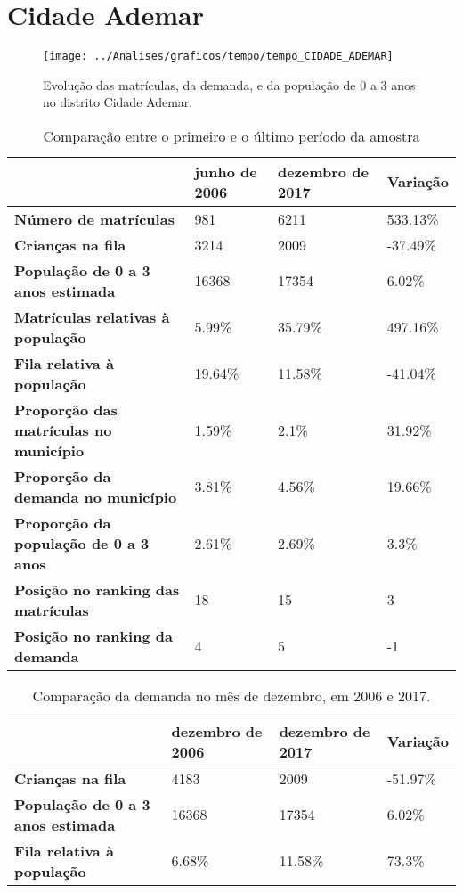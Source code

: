 \section{Cidade Ademar}
\begin{figure}[H]
\centering
\texttt{[image: ../Analises/graficos/tempo/tempo\_CIDADE\_ADEMAR]}
\caption{Evolução das matrículas, da demanda, e da população de 0 a 3 anos no distrito Cidade Ademar.}
\end{figure}
\begin{table}[H]
\begin{tabular}{|l|l|l|l|}
\hline
\textbf{}                                      & \textbf{junho de 2006}       & \textbf{dezembro de 2017}    & \textbf{Variação} \\ \hline
\textbf{Número de matrículas}                  & 981 & 6211 & 533.13\% \\ \hline
\textbf{Crianças na fila}                      & 3214 & 2009 & -37.49\% \\ \hline
\textbf{População de 0 a 3 anos estimada}      & 16368 & 17354 & 6.02\% \\ \hline
\textbf{Matrículas relativas à população}      & 5.99\% & 35.79\% & 497.16\% \\ \hline
\textbf{Fila relativa à população}             & 19.64\% & 11.58\% & -41.04\% \\ \hline
\textbf{Proporção das matrículas no município} & 1.59\% & 2.1\% & 31.92\% \\ \hline
\textbf{Proporção da demanda no município}     & 3.81\% & 4.56\% & 19.66\% \\ \hline
\textbf{Proporção da população de 0 a 3 anos}  & 2.61\% & 2.69\% & 3.3\% \\ \hline
\textbf{Posição no ranking das matrículas}     & 18 & 15 & 3 \\ \hline
\textbf{Posição no ranking da demanda}         & 4 & 5 & -1 \\ \hline
\end{tabular}
\caption{Comparação entre o primeiro e o último período da amostra}
\end{table}
\begin{table}[H]
\begin{tabular}{|l|l|l|l|}
\hline
\textbf{}                                 & \textbf{dezembro de 2006} & \textbf{dezembro de 2017} & \textbf{Variação} \\ \hline
\textbf{Crianças na fila}                      & 4183 & 2009 & -51.97\% \\ \hline
\textbf{População de 0 a 3 anos estimada}      & 16368 & 17354 & 6.02\% \\ \hline
\textbf{Fila relativa à população}             & 6.68\% & 11.58\% & 73.3\% \\ \hline
\end{tabular}
\caption{Comparação da demanda no mês de dezembro, em 2006 e 2017.}
\end{table}
